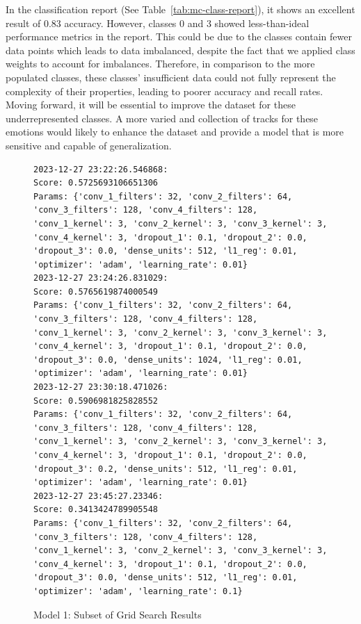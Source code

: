 In the classification report (See Table~\ref{tab:mc-class-report}), it shows an excellent result of 0.83 accuracy.
However, classes 0 and 3 showed less-than-ideal performance metrics in the report.
This could be due to the classes contain fewer data points which leads to data imbalanced, despite the fact that we applied class weights to account for imbalances.
Therefore, in comparison to the more populated classes, these classes' insufficient data could not fully represent the complexity of their properties, leading to poorer accuracy and recall rates.
\\
\indent Moving forward, it will be essential to improve the dataset for these underrepresented classes.
A more varied and collection of tracks for these emotions would likely to enhance the dataset and provide a model that is more sensitive and capable of generalization.

\newpage

\setcounter{figure}{0}
\setcounter{table}{0} 
\begin{figure}[H]
\begin{verbatim}
2023-12-27 23:22:26.546868:
Score: 0.5725693106651306
Params: {'conv_1_filters': 32, 'conv_2_filters': 64, 'conv_3_filters': 128, 'conv_4_filters': 128, 'conv_1_kernel': 3, 'conv_2_kernel': 3, 'conv_3_kernel': 3, 'conv_4_kernel': 3, 'dropout_1': 0.1, 'dropout_2': 0.0, 'dropout_3': 0.0, 'dense_units': 512, 'l1_reg': 0.01, 'optimizer': 'adam', 'learning_rate': 0.01}
2023-12-27 23:24:26.831029:
Score: 0.5765619874000549
Params: {'conv_1_filters': 32, 'conv_2_filters': 64, 'conv_3_filters': 128, 'conv_4_filters': 128, 'conv_1_kernel': 3, 'conv_2_kernel': 3, 'conv_3_kernel': 3, 'conv_4_kernel': 3, 'dropout_1': 0.1, 'dropout_2': 0.0, 'dropout_3': 0.0, 'dense_units': 1024, 'l1_reg': 0.01, 'optimizer': 'adam', 'learning_rate': 0.01}
2023-12-27 23:30:18.471026:
Score: 0.5906981825828552
Params: {'conv_1_filters': 32, 'conv_2_filters': 64, 'conv_3_filters': 128, 'conv_4_filters': 128, 'conv_1_kernel': 3, 'conv_2_kernel': 3, 'conv_3_kernel': 3, 'conv_4_kernel': 3, 'dropout_1': 0.1, 'dropout_2': 0.0, 'dropout_3': 0.2, 'dense_units': 512, 'l1_reg': 0.01, 'optimizer': 'adam', 'learning_rate': 0.01}
2023-12-27 23:45:27.23346:
Score: 0.3413424789905548
Params: {'conv_1_filters': 32, 'conv_2_filters': 64, 'conv_3_filters': 128, 'conv_4_filters': 128, 'conv_1_kernel': 3, 'conv_2_kernel': 3, 'conv_3_kernel': 3, 'conv_4_kernel': 3, 'dropout_1': 0.1, 'dropout_2': 0.0, 'dropout_3': 0.0, 'dense_units': 512, 'l1_reg': 0.01, 'optimizer': 'adam', 'learning_rate': 0.1}
\end{verbatim}
\caption{Model 1: Subset of Grid Search Results}
\label{fig:model-1-grid-result}
\end{figure}

